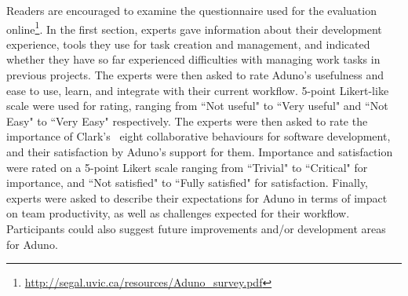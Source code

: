 \documentclass[conference]{IEEEtran}
\newcommand{\cmark}{\ding{51}}%
\begin{document}
%

Readers are encouraged to examine the questionnaire used for the evaluation online\footnote{\url{http://segal.uvic.ca/resources/Aduno_survey.pdf}}. In the first section, experts gave information about their development experience, tools they use for task creation and management, and indicated whether they have so far experienced difficulties with managing work tasks in previous projects. The experts were then asked to rate Aduno's usefulness and ease to use, learn, and integrate with their current workflow. 5-point Likert-like scale were used for rating, ranging from ``Not useful" to ``Very useful" and ``Not Easy" to ``Very Easy" respectively. The experts were then asked to rate the importance of Clark's~\cite{Clark96} eight collaborative behaviours for software development, and their satisfaction by Aduno's support for them. Importance and satisfaction were rated on a 5-point Likert scale ranging from ``Trivial" to ``Critical" for importance, and ``Not satisfied" to ``Fully satisfied" for satisfaction. Finally, experts were asked to describe their expectations for Aduno in terms of impact on team productivity, as well as challenges expected for their workflow. Participants could also suggest future improvements and/or development areas for Aduno.
\end{document}
